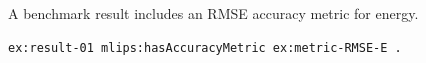 A benchmark result includes an RMSE accuracy metric for energy.
\begin{lstlisting}[language=turtle]
ex:result-01 mlips:hasAccuracyMetric ex:metric-RMSE-E .
\end{lstlisting}
